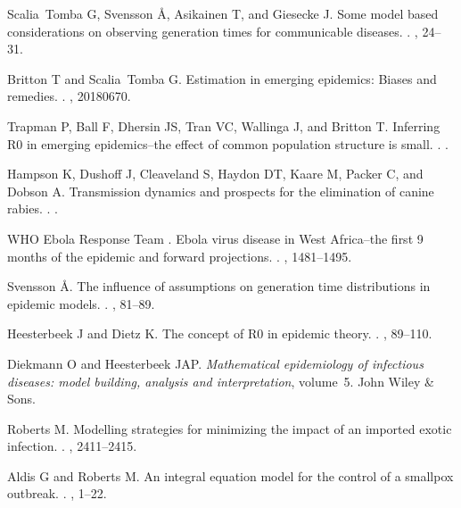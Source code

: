 \documentclass[12pt]{article}
\begin{document}
\begin{thebibliography}{10}
Scalia~Tomba G, Svensson {\AA}, Asikainen T, and Giesecke J.
 Some model based considerations on observing generation times
  for communicable diseases.
.
, 24--31.

Britton T and Scalia~Tomba G.
 Estimation in emerging epidemics: {Biases} and remedies.
.
, 20180670.

Trapman P, Ball F, Dhersin JS, Tran VC, Wallinga J, and Britton T.
 Inferring {R0} in emerging epidemics--the effect of common
  population structure is small.
.
.

Hampson K, Dushoff J, Cleaveland S, Haydon DT, Kaare M, Packer C, and Dobson A.
 Transmission dynamics and prospects for the elimination of
  canine rabies.
.
.

{WHO Ebola Response Team} .
 {Ebola virus disease in West Africa--the first 9 months of the
  epidemic and forward projections}.
.
, 1481--1495.

Svensson {\AA}.
 The influence of assumptions on generation time distributions in
  epidemic models.
.
, 81--89.

Heesterbeek J and Dietz K.
 The concept of {R0} in epidemic theory.
.
, 89--110.

Diekmann O and Heesterbeek JAP.
 {\em Mathematical epidemiology of infectious diseases: model
  building, analysis and interpretation}, volume~5.
\newblock John Wiley \& Sons.

Roberts M.
 Modelling strategies for minimizing the impact of an imported
  exotic infection.
.
, 2411--2415.

Aldis G and Roberts M.
 An integral equation model for the control of a smallpox
  outbreak.
.
, 1--22.


\end{thebibliography}
\end{document}
